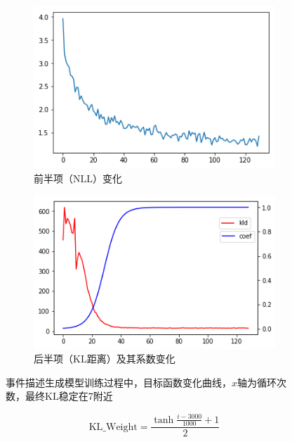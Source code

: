 \documentclass[]{template}
\begin{document}
\begin{figure}[htb]
    \centering
	\begin{subfigure}{.4\textwidth}
		\includegraphics[width=\textwidth]{ce.png}
		\caption{前半项（$\mathrm{NLL}$）变化}
	\end{subfigure}
	\begin{subfigure}{.425\textwidth}
		\includegraphics[width=\textwidth]{ceof.png}
		\caption{后半项（$\mathrm{KL}$距离）及其系数变化}
    \end{subfigure}
    \caption{事件描述生成模型训练过程中，目标函数变化曲线，$x$轴为循环次数，最终$\mathrm{KL}$稳定在7附近}
    \label{f3-2}
\end{figure}

\begin{equation}\label{3-8}
    \mathrm{KL\_Weight}=\frac{\tanh\frac{i-3000}{1000}+1}{2}
\end{equation}
\end{document}
